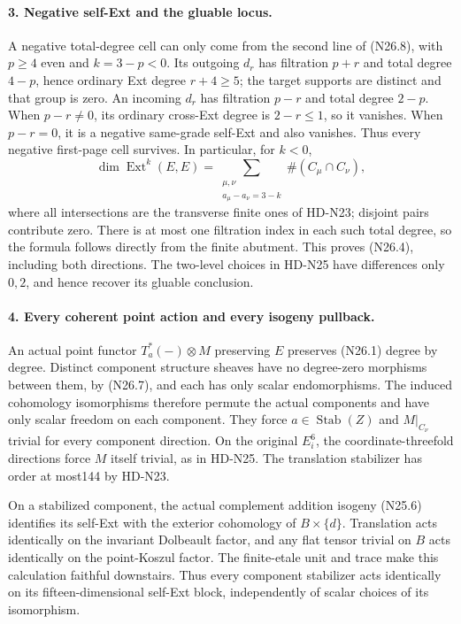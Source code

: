 \paragraph{3. Negative self-Ext and the gluable locus.}
A negative total-degree cell can only come from the second
line of (N26.8), with $p\ge4$ even and $k=3-p<0$.
Its outgoing $d_r$ has filtration $p+r$ and total degree
$4-p$, hence ordinary Ext degree $r+4\ge5$; the target
supports are distinct and that group is zero. An incoming
$d_r$ has filtration $p-r$ and total degree $2-p$.
When $p-r\ne0$, its ordinary cross-Ext degree is
$2-r\le1$, so it vanishes. When $p-r=0$, it is a
negative same-grade self-Ext and also vanishes. Thus every
negative first-page cell survives. In particular, for $k<0$,
\[
 \dim\operatorname{Ext}^k(E,E)=
 \sum_{\substack{\mu,\nu\\a_\mu-a_\nu=3-k}}
                         \#(C_\mu\cap C_\nu),           \tag{N26.10}
\]
where all intersections are the transverse finite ones of
HD-N23; disjoint pairs contribute zero. There is at most
one filtration index in each such total degree, so the
formula follows directly from the finite abutment.
This proves (N26.4), including both directions. The
two-level choices in HD-N25 have differences only $0,2$,
and hence recover its gluable conclusion.

\paragraph{4. Every coherent point action and every isogeny pullback.}
An actual point functor $T_a^*(-)\otimes M$ preserving $E$
preserves (N26.1) degree by degree. Distinct component
structure sheaves have no degree-zero morphisms between
them, by (N26.7), and each has only scalar endomorphisms.
The induced cohomology isomorphisms therefore permute the
actual components and have only scalar freedom on each
component. They force $a\in\operatorname{Stab}(Z)$ and
$M|_{C_\nu}$ trivial for every component direction.
On the original $E_i^6$, the coordinate-threefold
directions force $M$ itself trivial, as in HD-N25. The
translation stabilizer has order at most144 by HD-N23.

On a stabilized component, the actual complement addition
isogeny (N25.6) identifies its self-Ext with the exterior
cohomology of $B\times\{d\}$. Translation acts identically
on the invariant Dolbeault factor, and any flat tensor
trivial on $B$ acts identically on the point-Koszul factor.
The finite-etale unit and trace make this calculation
faithful downstairs. Thus every component stabilizer acts
identically on its fifteen-dimensional self-Ext block,
independently of scalar choices of its isomorphism.

